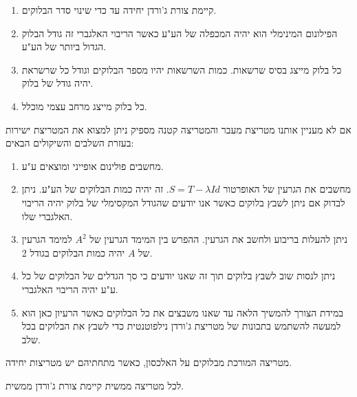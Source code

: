 \documentclass{tstextbook}
\begin{document}
\begin{proposition}
  \begin{enumerate}
    \item קיימת צורת ג'ורדן יחידה עד כדי שינוי סדר הבלוקים. 


    \item הפילונום המינימלי הוא יהיה המכפלה של הע"ע כאשר הריבוי האלגברי זה גודל הבלוק הגדול ביותר של הע"ע. 


    \item כל בלוק מייצג בסיס שרשאות. כמות השרשאות יהיו מספר הבלוקים וגודל כל שרשראת יהיה גודל של בלוק. 


    \item כל בלוק מייצג מרחב עצמי מוכלל. 


  \end{enumerate}
\end{proposition}
\begin{remark}
אם לא מעניין אותנו מטריצת מעבר והמטריצה קטנה מספיק ניתן למצוא את המטריצת ישירות בעזרת השלבים והשיקולים הבאים:

\end{remark}
\begin{enumerate}
  \item מחשבים פולינום אופייני ומוצאים ע"ע.  


  \item מחשבים את הגרעין של האופרטור \(S=T-\lambda Id\). זה יהיה כמות הבלוקים של הע"ע.  ניתן לבדוק אם ניתן לשבץ בלוקים כאשר אנו יודעים שהגודל המקסימלי של בלוק יהיה הריבוי האלגברי שלו. 


  \item ניתן להעלות בריבוע ולחשב את הגרעין. ההפרש בין המימד הגרעין של \(A^2\) למימד הגרעין של \(A\) יהיה כמות הבלוקים בגודל 2. 


  \item ניתן לנסות שוב לשבץ בלוקים תוך זה שאנו יודעים כי סך הגדלים של הבלוקים של כל ע"ע יהיה הריבוי האלגברי. 


  \item במידת הצורך להמשיך הלאה עד שאנו משבצים את כל הבלוקים 
כאשר הרעיון כאן הוא למעשה להשתמש בתכונות של מטריצת ג'ורדן נילפוטנטית כדי לשבץ את הבלוקים בכל שלב.


\end{enumerate}
\begin{definition}
מטריצה המורכת מבלוקים על האלכסון, כאשר מתחתיהם יש מטריצות יחידה.

\end{definition}
\begin{proposition}
לכל מטריצה ממשית קיימת צורת ג'ורדן ממשית. 

\end{proposition}
\end{document}
